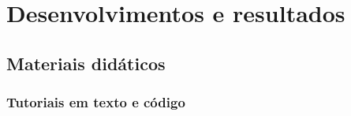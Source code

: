 \chapter{Desenvolvimentos e resultados} %
\label{cap:intro} %

\section{Materiais didáticos}

\subsection{Tutoriais em texto e código}

